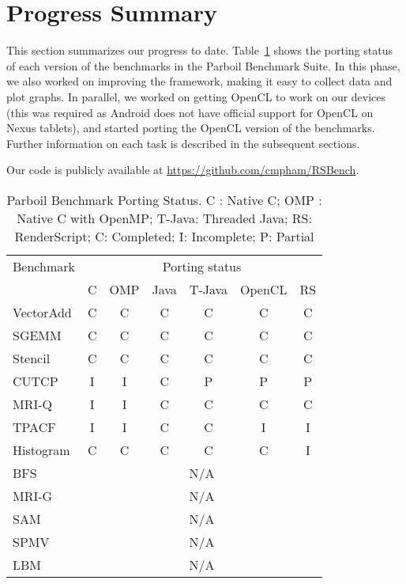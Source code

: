 \section*{Progress Summary}

This section summarizes our progress to date. Table~\ref{table:parboil} shows the
porting status of each version of the benchmarks in the Parboil Benchmark Suite.
In this phase, we also worked on improving the framework, making it easy to collect
data and plot graphs. In parallel, we worked on getting OpenCL to work on our
devices (this was required as Android does not have official support for OpenCL
on Nexus tablets), and started porting the OpenCL version of the benchmarks. 
Further information on each task is described in the subsequent sections.

Our code is publicly available at \url{https://github.com/cmpham/RSBench}.

\begin{table}[h]\small
\centering
\begin{tabular}{ | l | c | c | c | c | c | c |}
    \hline 
    Benchmark & \multicolumn{6}{|c|}{Porting status} \\ \cline{2-7}
            & C & OMP & Java & T-Java & OpenCL & RS \\ \hline
    VectorAdd & C & C & C & C & C & C \\ \hline
    SGEMM & C & C & C & C & C & C \\ \hline
    Stencil & C & C & C & C & C & C \\ \hline
    CUTCP & I & I & C & P  & P  & P \\ \hline
    MRI-Q & I & I & C & C & C & C \\ \hline
    TPACF & I & I & C & C & I & I \\ \hline
    Histogram & C & C & C & C & C & I \\ \hline
    BFS & \multicolumn{6}{|c|}{N/A} \\ \hline
    MRI-G & \multicolumn{6}{|c|}{N/A} \\ \hline
    SAM & \multicolumn{6}{|c|}{N/A} \\ \hline
    SPMV & \multicolumn{6}{|c|}{N/A} \\ \hline
    LBM & \multicolumn{6}{|c|}{N/A} \\ \hline
    \hline
\end{tabular}
\caption{Parboil Benchmark Porting Status. C : Native C; OMP : Native C with OpenMP; T-Java: Threaded Java; RS:
RenderScript; C: Completed; I: Incomplete; P: Partial}
\label{table:parboil}
\end{table}

